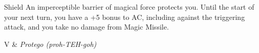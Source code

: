 \begin{Spell}[
  level=1st,
  time=1 Reaction\fmark,
  range=Self,
  components={V, S},
  duration=1 Round,
  school=Abjuration,
  attack=None,
  effect=Warding
]{Shield}
  An imperceptible barrier of magical force protects you. Until the start of your next turn, you have a +5 bonus to AC, including against the triggering attack, and you take no damage from Magic Missile.

\begin{components}
V & \textit{Protego (proh-TEH-goh)}
\end{components}

\end{Spell}


